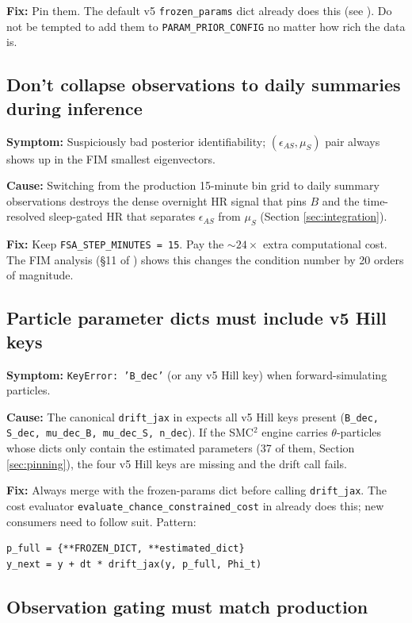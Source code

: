 \documentclass[11pt,a4paper]{article}
\theoremstyle{definition}
\begin{document}
\textbf{Fix:} Pin them. The default v5 \texttt{frozen\_params} dict
already does this (see ). Do not be tempted to add
them to \texttt{PARAM\_PRIOR\_CONFIG} no matter how rich the data is.

\subsection{Don't collapse observations to daily summaries during inference}

\textbf{Symptom:} Suspiciously bad posterior identifiability;
$(\epsilon_{AS}, \mu_S)$ pair always shows up in the FIM smallest
eigenvectors.

\textbf{Cause:} Switching from the production 15-minute bin grid to
daily summary observations destroys the dense overnight HR signal that
pins $B$ and the time-resolved sleep-gated HR that separates
$\epsilon_{AS}$ from $\mu_S$ (Section \ref{sec:integration}).

\textbf{Fix:} Keep \texttt{FSA\_STEP\_MINUTES = 15}. Pay the
$\sim 24\times$ extra computational cost. The FIM analysis (§11 of
) shows this changes the condition number by 20 orders
of magnitude.

\subsection{Particle parameter dicts must include v5 Hill keys}

\textbf{Symptom:} \texttt{KeyError: 'B\_dec'} (or any v5 Hill key) when
forward-simulating particles.

\textbf{Cause:} The canonical \texttt{drift\_jax} in
 expects all v5 Hill keys present (\texttt{B\_dec,
S\_dec, mu\_dec\_B, mu\_dec\_S, n\_dec}). If the SMC$^2$ engine carries
$\theta$-particles whose dicts only contain the estimated parameters
(37 of them, Section \ref{sec:pinning}), the four v5 Hill keys are
missing and the drift call fails.

\textbf{Fix:} Always merge with the frozen-params dict before calling
\texttt{drift\_jax}. The cost evaluator
\texttt{evaluate\_chance\_constrained\_cost} in
 already does this; new consumers need to follow
suit. Pattern:
\begin{lstlisting}
p_full = {**FROZEN_DICT, **estimated_dict}
y_next = y + dt * drift_jax(y, p_full, Phi_t)
\end{lstlisting}

\subsection{Observation gating must match production}
\end{document}

